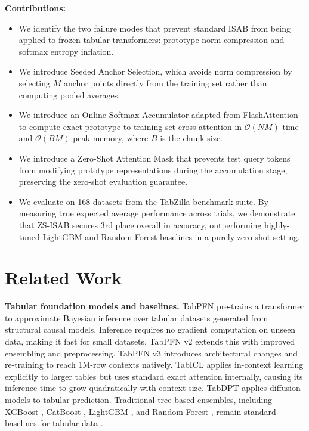 \documentclass{article}
\begin{document}
\textbf{Contributions:}
\begin{itemize}
    \item We identify the two failure modes that prevent standard ISAB from being applied to frozen tabular transformers: prototype norm compression and softmax entropy inflation.
    \item We introduce Seeded Anchor Selection, which avoids norm compression by selecting $M$ anchor points directly from the training set rather than computing pooled averages.
    \item We introduce an Online Softmax Accumulator adapted from FlashAttention \citep{dao2022flashattention} to compute exact prototype-to-training-set cross-attention in $\mathcal{O}(NM)$ time and $\mathcal{O}(BM)$ peak memory, where $B$ is the chunk size.
    \item We introduce a Zero-Shot Attention Mask that prevents test query tokens from modifying prototype representations during the accumulation stage, preserving the zero-shot evaluation guarantee.
    \item We evaluate on 168 datasets from the TabZilla benchmark suite. By measuring true expected average performance across trials, we demonstrate that ZS-ISAB secures 3rd place overall in accuracy, outperforming highly-tuned LightGBM and Random Forest baselines in a purely zero-shot setting.
\end{itemize}

\section{Related Work}

\textbf{Tabular foundation models and baselines.}
TabPFN \citep{hollmann2022tabpfn} pre-trains a transformer to approximate Bayesian inference over tabular datasets generated from structural causal models. Inference requires no gradient computation on unseen data, making it fast for small datasets. TabPFN v2 \citep{hollmann2025tabpfn2} extends this with improved ensembling and preprocessing. TabPFN v3 \citep{hollmann2025tabpfn3} introduces architectural changes and re-training to reach 1M-row contexts natively. TabICL \citep{huang2024tabicl} applies in-context learning explicitly to larger tables but uses standard exact attention internally, causing its inference time to grow quadratically with context size. TabDPT \citep{ma2024tabdpt} applies diffusion models to tabular prediction. Traditional tree-based ensembles, including XGBoost \citep{chen2016xgboost}, CatBoost \citep{prokhorenkova2018catboost}, LightGBM \citep{ke2017lightgbm}, and Random Forest \citep{breiman2001random}, remain standard baselines for tabular data \citep{grinsztajn2022tree}.
\end{document}
